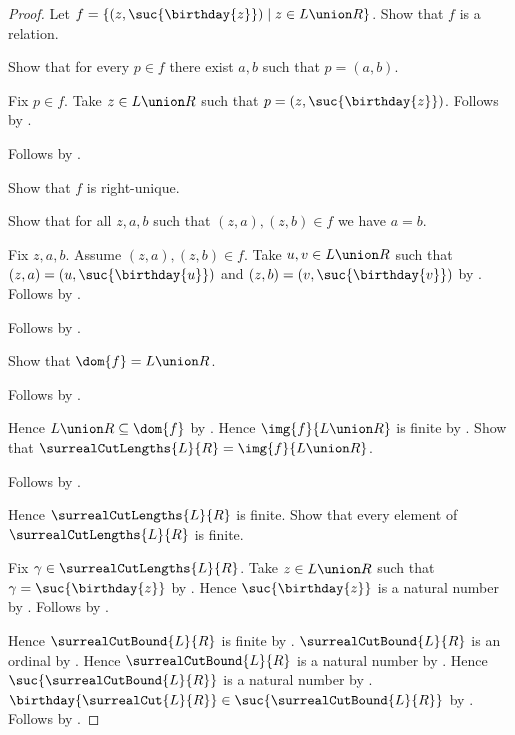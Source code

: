 \begin{proof}
    Let $f=\{(z,\suc{\birthday{z}})\mid z\in L\union R\}$.
    Show that $f$ is a relation.
    \begin{subproof}
        Show that for every $p\in f$ there exist $a,b$ such that
            $p=(a,b)$.
        \begin{subproof}
            Fix $p\in f$.
            Take $z\in L\union R$ such that
                $p=(z,\suc{\birthday{z}})$.
            Follows by \auto.
        \end{subproof}
        Follows by .
    \end{subproof}
    Show that $f$ is right-unique.
    \begin{subproof}
        Show that for all $z,a,b$ such that $(z,a),(z,b)\in f$
            we have $a=b$.
        \begin{subproof}
            Fix $z,a,b$.
            Assume $(z,a),(z,b)\in f$.
            Take $u,v\in L\union R$ such that
                $(z,a)=(u,\suc{\birthday{u}})$ and
                $(z,b)=(v,\suc{\birthday{v}})$
                by .
            Follows by .
        \end{subproof}
        Follows by .
    \end{subproof}
    Show that $\dom{f}=L\union R$.
    \begin{subproof}
        Follows by .
    \end{subproof}
    Hence $L\union R\subseteq\dom{f}$ by .
    Hence $\img{f}{L\union R}$ is finite
        by .
    Show that $\surrealCutLengths{L}{R}=\img{f}{L\union R}$.
    \begin{subproof}
        Follows by
            .
    \end{subproof}
    Hence $\surrealCutLengths{L}{R}$ is finite.
    Show that every element of $\surrealCutLengths{L}{R}$ is finite.
    \begin{subproof}
        Fix $\gamma\in\surrealCutLengths{L}{R}$.
        Take $z\in L\union R$ such that $\gamma=\suc{\birthday{z}}$
            by .
        Hence $\suc{\birthday{z}}$ is a natural number
            by .
        Follows by .
    \end{subproof}
    Hence $\surrealCutBound{L}{R}$ is finite
        by .
    $\surrealCutBound{L}{R}$ is an ordinal
        by .
    Hence $\surrealCutBound{L}{R}$ is a natural number
        by .
    Hence $\suc{\surrealCutBound{L}{R}}$ is a natural number
        by .
    $\birthday{\surrealCut{L}{R}}\in
        \suc{\surrealCutBound{L}{R}}$
        by .
    Follows by
        .
\end{proof}


